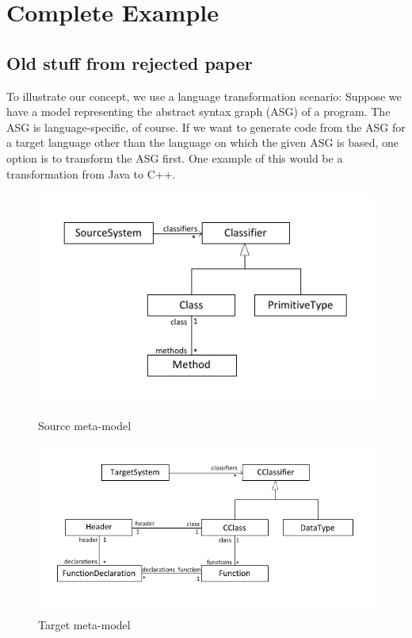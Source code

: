 \chapter{Complete Example}

\section*{Old stuff from rejected paper}

To illustrate our concept, we use a language transformation scenario: Suppose we have a model representing the abstract syntax graph (ASG) of a program. The ASG is language-specific, of course. If we want to generate code from the ASG for a target language other than the language on which the given ASG is based, one option is to transform the ASG first.
One example of this would be a transformation from Java to C++.

\begin{figure}[ht]

\begin{minipage}[b]{0.42\linewidth}
	\centering
	\includegraphics[scale=0.7]{figures/sourceMetamodel}
\caption{Source meta-model}
\label{fig:sourceMetamodel}
\end{minipage}
\hfill
\begin{minipage}[b]{0.55\linewidth}
\centering
	\includegraphics[scale=0.7]{figures/targetMetamodel}
\caption{Target meta-model}
\label{fig:targetMetamodel}
\end{minipage}

\end{figure}


